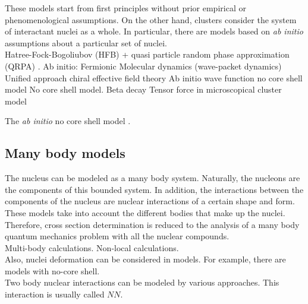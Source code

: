 \documentclass[openany]{book}
\begin{document}
These models start from first principles without prior empirical or phenomenological assumptions. 
On the other hand, clusters consider the system of interactant nuclei as a whole. In particular, there are models based on \textit{ab initio} assumptions about a particular set of nuclei.  \\
 
Hatree-Fock-Bogoliubov (HFB) + quasi particle random phase approximation (QRPA) \cite{chimanski_in_escher_peru_younes_2022}.
Ab initio: Fermionic Molecular dynamics (wave-packet dynamics) \cite{neff_feldmeier_langanke_2011}
Unified approach chiral effective field theory  \cite{navratil_quaglioni_hupin_romero-redondo_calci_2016}
Ab initio wave function no core shell model \cite{navratil_bertulani_caurier_2006}
No core shell model. Beta decay \cite{atkinson_navratil_hupin_kravvaris_quaglioni_2022}
Tensor force in microscopical cluster model \cite{arai_aoyama_suzuki_descouvemont_baye_2013}

The \textit{ab initio} no core shell model \cite{barrett_navratil_vary_2013}. \\


\subsection{Many body models}  \label{sub:microscopical_manybody}

The nucleus can be modeled as a many body system. Naturally, the nucleons are the components of this bounded system. In addition, the interactions between the components of the nucleus are nuclear interactions of a certain shape and form.  \\

These models take into account the different bodies that make up the nuclei. \\

Therefore,  cross section determination is reduced to the analysis of a many body quantum mechanics problem with all the nuclear compounds. \\

Multi-body calculations.  Non-local calculations. \\

Also, nuclei deformation can be considered in models. For example, there are models with no-core shell. \\

Two body nuclear interactions can be modeled by various approaches. This interaction is usually called $NN$. \\
\end{document}
